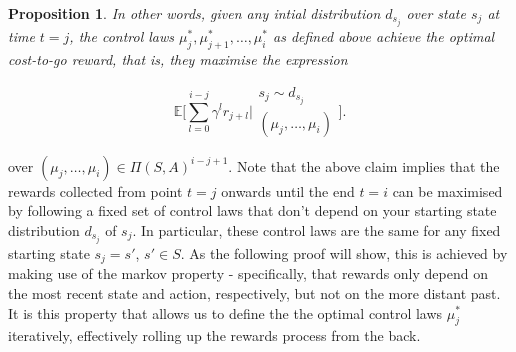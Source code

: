 \documentclass[11pt]{article} %
\newtheorem{prop}{Proposition}
\begin{document}
\begin{prop}
In other words, given any intial distribution $d_{s_j}$ over state $s_j$ at time $t=j$, the control laws $\mu_j^*,\mu_{j+1}^*,\dots,\mu_i^*$ as defined above achieve the optimal cost-to-go reward, that is, they maximise the expression

\begin{equation}
	 \mathbb{E} \Big[ \sum\limits_{l=0}^{i-j} \gamma^l r_{j+l} \Big| 	\begin{array}{c}
													s_j \sim d_{s_j} \\
													(\mu_j,\dots,\mu_i)
												\end{array} \Big].
\end{equation}

\end{prop}

over $(\mu_j,\dots,\mu_i) \in \Pi(S,A)^{i-j+1}$. Note that the above claim implies that the rewards collected from point $t=j$ onwards until the end $t=i$ can be maximised by following a fixed set of control laws that don't depend on your starting state distribution $d_{s_j}$ of $s_j$. In particular, these control laws are the same for any fixed starting state $s_j = s'$, $s' \in S$. As the following proof will show, this is achieved by making use of the markov property - specifically, that rewards only depend on the most recent state and action, respectively, but not on the more distant past. It is this property that allows us to define the the optimal control laws $\mu_j^*$ iteratively, effectively rolling up the rewards process from the back.
\end{document}
